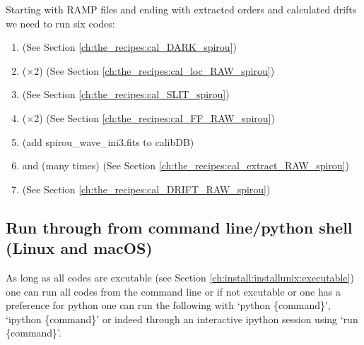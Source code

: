\noindent Starting with RAMP files and ending with extracted orders and calculated drifts we need to run six codes:
\begin{enumerate}
\item \calDARK \hfill (See Section \ref{ch:the_recipes:cal_DARK_spirou})
\item \callocRAW ($\times$2) \hfill (See Section \ref{ch:the_recipes:cal_loc_RAW_spirou})
\item \calSLIT \hfill (See Section \ref{ch:the_recipes:cal_SLIT_spirou})
\item \calFFraw ($\times$2) \hfill (See Section \ref{ch:the_recipes:cal_FF_RAW_spirou})
\item (add spirou\_wave\_ini3.fits to calibDB) 
\item \calextractRAWAB and \calextractRAWC (many times) \hfill (See Section \ref{ch:the_recipes:cal_extract_RAW_spirou})
\item \calDRIFTRAW \hfill (See Section \ref{ch:the_recipes:cal_DRIFT_RAW_spirou})
\end{enumerate}





\subsection{Run through from command line/python shell (Linux and macOS)}
\label{chapter:using_the_drs:working_example:run_cmd}

As long as all codes are excutable (see Section \ref{ch:install:installunix:executable}) one can run all codes from the command line or if not excutable or one has a preference for python one can run the following with `python \{command\}', `ipython \{command\}' or indeed through an interactive ipython session using `run \{command\}'.

